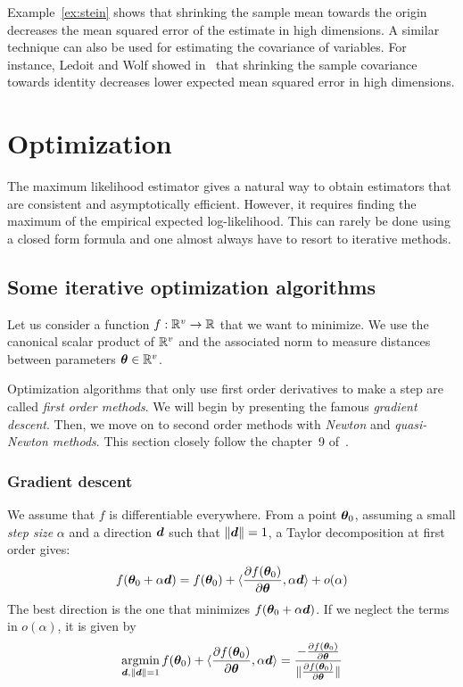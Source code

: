 Example~\ref{ex:stein} shows that shrinking the sample mean towards the
origin decreases the mean squared error of the estimate in high dimensions. A similar technique can also be used for estimating the covariance of variables. For instance, Ledoit
and Wolf showed in~\cite{ledoit2004well} that shrinking the sample covariance
towards identity decreases lower expected mean squared error in high dimensions.

\section{Optimization}
\label{sec:optimintro}
The maximum likelihood estimator gives a natural way to obtain estimators that
are consistent and asymptotically efficient.
However, it requires finding the maximum of the empirical expected
log-likelihood.
This can rarely be done using a closed form formula and one almost always have
to resort to iterative methods.


\subsection{Some iterative optimization algorithms}
Let us consider a function $f: \mathbb{R}^v \rightarrow \mathbb{R}$ that we
want to minimize. We use the canonical scalar product of $\mathbb{R}^v$ and the
associated norm to measure distances between parameters $\boldsymbol{\theta} \in \mathbb{R}^v$.


Optimization algorithms that only use first order derivatives to make a step are
called \emph{first order methods}. We will begin by presenting the famous
\emph{gradient descent}. Then, we move on to second order methods with \emph{Newton} and
\emph{quasi-Newton methods}. This section closely follow the chapter~9 of~\cite{boyd2004convex}.

\subsubsection{Gradient descent}
\label{sec:gd}
We assume that $f$ is differentiable everywhere.
From a point $\boldsymbol{\theta}_0$, assuming a small \emph{step size} $\alpha$ and a direction
$\boldsymbol{d}$ such that $\|\boldsymbol{d}\| = 1$, a Taylor decomposition at first order gives:
\begin{align}
f(\boldsymbol{\theta}_0 + \alpha \boldsymbol{d}) = f(\boldsymbol{\theta}_0) + \langle{  \frac{ \partial f(\boldsymbol{\theta}_0)}{\partial \boldsymbol{\theta}}  },{ \alpha \boldsymbol{d} }\rangle + o(\alpha) 
\end{align}
The best direction is the one that minimizes $f(\boldsymbol{\theta}_0 + \alpha \boldsymbol{d})$. If we
neglect the terms in $o(\alpha)$, it is given by
\begin{align}
  \operatorname*{argmin}_{\boldsymbol{d}, \|\boldsymbol{d}\| = 1} f(\boldsymbol{\theta}_0) + \langle{  \frac{ \partial f(\boldsymbol{\theta}_0)}{\partial \boldsymbol{\theta}}  },{ \alpha \boldsymbol{d} }\rangle = \frac{-\frac{ \partial f(\boldsymbol{\theta}_0)}{\partial \boldsymbol{\theta}}}{\|\frac{ \partial f(\boldsymbol{\theta}_0)}{\partial \boldsymbol{\theta}}\|}
\end{align}

